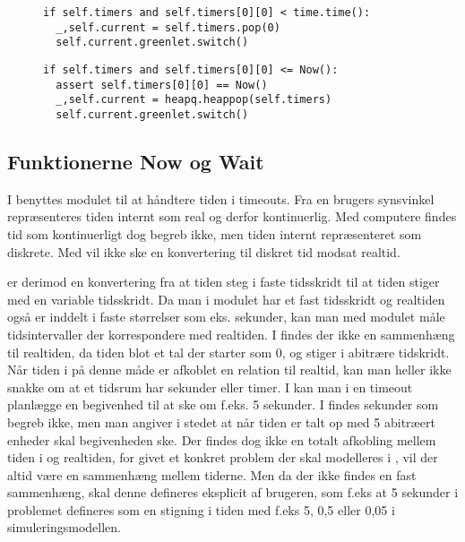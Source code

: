 \begin{figure}[hbtp]
\begin{minipage}[c]{\linewidth}
\begin{lstlisting}[firstnumber=204, label=fig:green:timer, caption=Udvælgelse af proces fra listen timers (fra scheduling.py)]
if self.timers and self.timers[0][0] < time.time():
  _,self.current = self.timers.pop(0)
  self.current.greenlet.switch()
\end{lstlisting}
\end{minipage}
\begin{minipage}[c]{\linewidth}
\begin{lstlisting}[firstnumber=124, label=fig:sim:timer, caption=Udvælgelse af proces fra listen timers (fra simulation.py)]
if self.timers and self.timers[0][0] <= Now():
  assert self.timers[0][0] == Now()
  _,self.current = heapq.heappop(self.timers)
  self.current.greenlet.switch()
\end{lstlisting}
\end{minipage}
\end{figure}

\subsection{Funktionerne Now og Wait}\label{sec:Wait}
 I \pycsp benyttes modulet 
 til at håndtere tiden i timeouts. Fra en brugers synsvinkel
repræsenteres tiden internt som real og derfor kontinuerlig. Med computere findes tid som
kontinuerligt dog begreb ikke, men  tiden internt repræsenteret
som diskrete. Med  \des vil ikke ske en konvertering til diskret
tid modsat realtid. 

\Des er derimod en konvertering fra at tiden steg i faste tidsskridt til at tiden stiger med en variable tidsskridt. 
Da man i  modulet har et fast tidsskridt og
realtiden også er inddelt i faste størrelser
som eks. sekunder, kan man med  modulet måle tidsintervaller der
korrespondere med realtiden. I \des findes der ikke en
sammenhæng til  realtiden, da tiden blot et tal der starter som 0, og stiger
i abitrære tidskridt. Når tiden i \des på denne måde er afkoblet
en relation til realtid, kan man heller ikke snakke om at et tidsrum
har sekunder eller timer. I \pycsp kan man i en timeout planlægge en
begivenhed til at ske om f.eks. 5 sekunder. I \des findes sekunder som
begreb ikke, men man  angiver i stedet at når tiden er talt op med 5 abitræert enheder skal
begivenheden ske. Der findes dog ikke en totalt afkobling mellem tiden i \des og realtiden, for givet et konkret problem der skal modelleres i \des, vil der altid være en sammenhæng mellem tiderne. Men da der ikke findes en fast sammenhæng, skal denne defineres eksplicit af brugeren, som f.eks at 5 sekunder i problemet defineres som en stigning i tiden med f.eks 5, 0,5 eller 0,05 i simuleringsmodellen.

